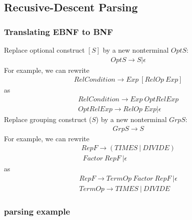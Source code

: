 \subsection{Recusive-Descent Parsing}
\subsubsection{Translating EBNF to BNF}

Replace optional construct $[S]$ by a new nonterminal $OptS$:
\begin{align*}
    OptS \rightarrow S | \epsilon
\end{align*}
For example, we can rewrite
\begin{align*}
    RelCondition \rightarrow Exp \ [RelOp \ Exp]
\end{align*}
as
\begin{align*}
    RelCondition \rightarrow Exp \ OptRelExp \\
    OptRelExp \rightarrow RelOp \ Exp | \epsilon
\end{align*}
Replace grouping construct ($S$) by a new nonterminal $GrpS$:
\begin{align*}
    GrpS \rightarrow S
\end{align*}
For example, we can rewrite
\begin{align*}
    RepF \rightarrow (TIMES \ | \ DIVIDE) \\ \ Factor \ RepF \ | \epsilon
\end{align*}
as 
\begin{align*}
    RepF \rightarrow TermOp \ Factor \ RepF \ | \epsilon \\
    TermOp \rightarrow TIMES \ | \ DIVIDE
\end{align*}
\subsubsection{parsing example}
\vspace*{6.5cm}

\vspace*{0.3cm}
\newblock
